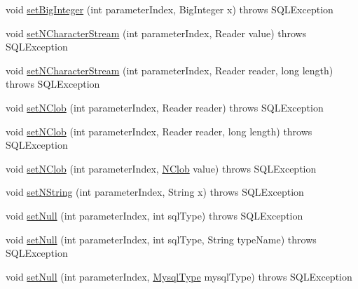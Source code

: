 \begin{DoxyCompactItemize}
\item 
void \mbox{\hyperlink{classcom_1_1mysql_1_1cj_1_1jdbc_1_1_client_prepared_statement_adc2b778f8c9e927d0e10dacab44d0230}{set\+Big\+Integer}} (int parameter\+Index, Big\+Integer x)  throws S\+Q\+L\+Exception 
\item 
void \mbox{\hyperlink{classcom_1_1mysql_1_1cj_1_1jdbc_1_1_client_prepared_statement_a0611fd7bd5e9c27740f073fb0d15f12a}{set\+N\+Character\+Stream}} (int parameter\+Index, Reader value)  throws S\+Q\+L\+Exception 
\item 
void \mbox{\hyperlink{classcom_1_1mysql_1_1cj_1_1jdbc_1_1_client_prepared_statement_a1062aa507a182c8345a14ff7e158ce43}{set\+N\+Character\+Stream}} (int parameter\+Index, Reader reader, long length)  throws S\+Q\+L\+Exception 
\item 
void \mbox{\hyperlink{classcom_1_1mysql_1_1cj_1_1jdbc_1_1_client_prepared_statement_a69b12e0f583a8c4cd4c65c936febe686}{set\+N\+Clob}} (int parameter\+Index, Reader reader)  throws S\+Q\+L\+Exception 
\item 
void \mbox{\hyperlink{classcom_1_1mysql_1_1cj_1_1jdbc_1_1_client_prepared_statement_a69736e3c678a7742877b18d1fdeaf7bf}{set\+N\+Clob}} (int parameter\+Index, Reader reader, long length)  throws S\+Q\+L\+Exception 
\item 
void \mbox{\hyperlink{classcom_1_1mysql_1_1cj_1_1jdbc_1_1_client_prepared_statement_aeab9fb7a04ac4d07d81e7c0080815b2a}{set\+N\+Clob}} (int parameter\+Index, \mbox{\hyperlink{classcom_1_1mysql_1_1cj_1_1jdbc_1_1_n_clob}{N\+Clob}} value)  throws S\+Q\+L\+Exception 
\item 
void \mbox{\hyperlink{classcom_1_1mysql_1_1cj_1_1jdbc_1_1_client_prepared_statement_a08a3846968d31fb8c91cb4cb384cd545}{set\+N\+String}} (int parameter\+Index, String x)  throws S\+Q\+L\+Exception 
\item 
void \mbox{\hyperlink{classcom_1_1mysql_1_1cj_1_1jdbc_1_1_client_prepared_statement_a18540732972b9e10e81482f19740512d}{set\+Null}} (int parameter\+Index, int sql\+Type)  throws S\+Q\+L\+Exception 
\item 
void \mbox{\hyperlink{classcom_1_1mysql_1_1cj_1_1jdbc_1_1_client_prepared_statement_a141caf8a4e840c7bc523388c2a14f0cf}{set\+Null}} (int parameter\+Index, int sql\+Type, String type\+Name)  throws S\+Q\+L\+Exception 
\item 
void \mbox{\hyperlink{classcom_1_1mysql_1_1cj_1_1jdbc_1_1_client_prepared_statement_aa53b4fe84756e62cb190a9218a8ec95b}{set\+Null}} (int parameter\+Index, \mbox{\hyperlink{enumcom_1_1mysql_1_1cj_1_1_mysql_type}{Mysql\+Type}} mysql\+Type)  throws S\+Q\+L\+Exception 

\end{DoxyCompactItemize}
